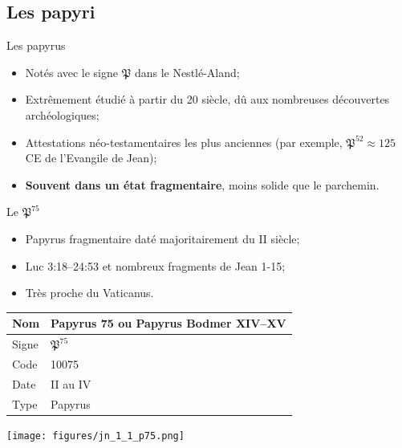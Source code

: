 \documentclass[11pt]{beamer}
\begin{document}
\subsection{Les papyri}


\begin{frame}{Les papyrus}
    \begin{itemize}
        \item Notés avec le signe $\mathfrak{P}$ dans le Nestlé-Aland;
        \item Extrêmement étudié à partir du 20\ieme{} siècle, dû aux nombreuses découvertes archéologiques;
        \item Attestations néo-testamentaires les plus anciennes (par exemple, $\mathfrak{P}^{52} \approx 125$ CE de l'Evangile de Jean);
        \item \textbf{Souvent dans un état fragmentaire}, moins solide que le parchemin.
    \end{itemize}
\end{frame}



\begin{frame}{Le $\mathfrak{P}^{75}$}
\begin{block}{}
    \begin{itemize}
        \item Papyrus fragmentaire daté majoritairement du II\ieme{} siècle;
        \item Luc 3:18–24:53 et nombreux fragments de Jean 1-15;
        \item Très proche du Vaticanus.
    \end{itemize}
\end{block}
    \vfill
\begin{minipage}{.45\textwidth}
\begin{tabularx}{\textwidth}{l|X}
    \small
     Nom & Papyrus 75 ou Papyrus Bodmer XIV–XV \\
     \hline
     Signe & $\mathfrak{P}^{75}$ \\
     \hline
     Code & 10075\\
     \hline
     Date & II\ieme{} au IV\ieme{} \\
     \hline
     Type & Papyrus \\
\end{tabularx}
\end{minipage}
\hfill
\begin{minipage}{.45\textwidth}
    \texttt{[image: figures/jn\_1\_1\_p75.png]}
\end{minipage}
    
\end{frame}
\end{document}

